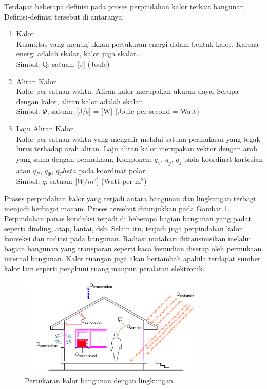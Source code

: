 Terdapat beberapa definisi pada proses perpindahan kalor terkait bangunan. Definisi-definisi tersebut di antaranya: \cite{BuildingPhysics}

\begin{enumerate}
	\item Kalor \\
	Kuantitas yang menunjukkan pertukaran energi dalam bentuk kalor. Karena energi adalah skalar, kalor juga skalar.\\
	Simbol: Q; satuan: [J] (Joule)
	\item Aliran Kalor \\
	Kalor per satuan waktu. Aliran kalor merupakan ukuran daya. Serupa dengan kalor, aliran kalor adalah skalar.\\
	Simbol: $\Phi$; satuan: [J/s] = [W] (Joule per second = Watt)
	\item Laju Aliran Kalor \\
	Kalor per satuan waktu yang mengalir melalui satuan permukaan yang tegak lurus terhadap arah aliran. Laju aliran kalor merupakan vektor dengan arah yang sama dengan permukaan. Komponen: $q_x$, $q_y$, $q_z$ pada koordinat kartesian atau $q_R$, $q_\Phi$, $q_Theta$ pada koordinat polar.\\
	Simbol: $q$; satuan: [$W/m^2$] (Watt per m$^2$)
\end{enumerate}

Proses perpindahan kalor yang terjadi antara bangunan dan lingkungan terbagi menjadi berbagai macam. Proses tersebut ditunjukkan pada Gambar \ref{fig:3:HeatTransferProcess}. Perpindahan panas konduksi terjadi di beberapa bagian bangunan yang padat seperti dinding, atap, lantai, dsb. Selain itu, terjadi juga perpindahan kalor konveksi dan radiasi pada bangunan. Radiasi matahari ditransmisikan melalui bagian bangunan yang transparan seperti kaca kemudian diserap oleh permukaan internal bangunan. Kalor ruangan juga akan bertambah apabila terdapat sumber kalor lain seperti penghuni ruang maupun peralatan elektronik. \cite{skripsiIchfan}

\begin{figure}[!h]
	\centering
	\includegraphics[width=0.8\textwidth]{figures/HeatTransferProcess}
	\caption{Pertukaran kalor bangunan dengan lingkungan\cite{skripsiIchfan}}
	\label{fig:3:HeatTransferProcess}
\end{figure}

